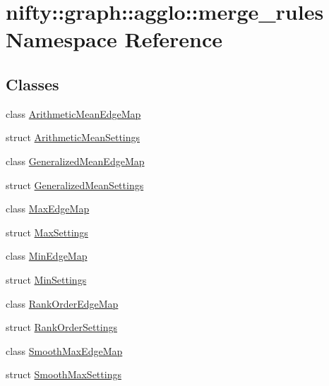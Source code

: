 \hypertarget{namespacenifty_1_1graph_1_1agglo_1_1merge__rules}{}\section{nifty\+:\+:graph\+:\+:agglo\+:\+:merge\+\_\+rules Namespace Reference}
\label{namespacenifty_1_1graph_1_1agglo_1_1merge__rules}
\subsection*{Classes}
\begin{DoxyCompactItemize}
\item 
class \hyperlink{classnifty_1_1graph_1_1agglo_1_1merge__rules_1_1ArithmeticMeanEdgeMap}{Arithmetic\+Mean\+Edge\+Map}
\item 
struct \hyperlink{structnifty_1_1graph_1_1agglo_1_1merge__rules_1_1ArithmeticMeanSettings}{Arithmetic\+Mean\+Settings}
\item 
class \hyperlink{classnifty_1_1graph_1_1agglo_1_1merge__rules_1_1GeneralizedMeanEdgeMap}{Generalized\+Mean\+Edge\+Map}
\item 
struct \hyperlink{structnifty_1_1graph_1_1agglo_1_1merge__rules_1_1GeneralizedMeanSettings}{Generalized\+Mean\+Settings}
\item 
class \hyperlink{classnifty_1_1graph_1_1agglo_1_1merge__rules_1_1MaxEdgeMap}{Max\+Edge\+Map}
\item 
struct \hyperlink{structnifty_1_1graph_1_1agglo_1_1merge__rules_1_1MaxSettings}{Max\+Settings}
\item 
class \hyperlink{classnifty_1_1graph_1_1agglo_1_1merge__rules_1_1MinEdgeMap}{Min\+Edge\+Map}
\item 
struct \hyperlink{structnifty_1_1graph_1_1agglo_1_1merge__rules_1_1MinSettings}{Min\+Settings}
\item 
class \hyperlink{classnifty_1_1graph_1_1agglo_1_1merge__rules_1_1RankOrderEdgeMap}{Rank\+Order\+Edge\+Map}
\item 
struct \hyperlink{structnifty_1_1graph_1_1agglo_1_1merge__rules_1_1RankOrderSettings}{Rank\+Order\+Settings}
\item 
class \hyperlink{classnifty_1_1graph_1_1agglo_1_1merge__rules_1_1SmoothMaxEdgeMap}{Smooth\+Max\+Edge\+Map}
\item 
struct \hyperlink{structnifty_1_1graph_1_1agglo_1_1merge__rules_1_1SmoothMaxSettings}{Smooth\+Max\+Settings}
\end{DoxyCompactItemize}
